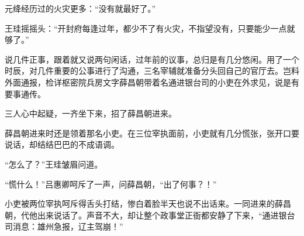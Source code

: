 元绛经历过的火灾更多：“没有就最好了。”

王珪摇摇头：“开封府每逢过年，都少不了有火灾，不指望没有，只要能少一点就够了。”

说几件正事，跟着就又说两句闲话，过年前的议事，总归是有几分悠闲。用了一个时辰，对几件重要的公事进行了沟通，三名宰辅就准备分头回自己的官厅去。岂料外面通报，检详枢密院兵房文字薛昌朝带着名通进银台司的小吏在外求见，说是有要事通传。

三人心中起疑，一齐坐下来，招了薛昌朝进来。

薛昌朝进来时还是领着那名小吏。在三位宰执面前，小吏就有几分慌张，张开口要说话，却结结巴巴的不成语调。

“怎么了？”王珪皱眉问道。

“慌什么！”吕惠卿呵斥了一声，问薛昌朝，“出了何事？！”

小吏被两位宰执呵斥得舌头打结，惨白着脸半天也说不出话来。一同进来的薛昌朝，代他出来说话了。声音不大，却让整个政事堂正衙都安静了下来，“通进银台司消息：雄州急报，辽主驾崩！”

